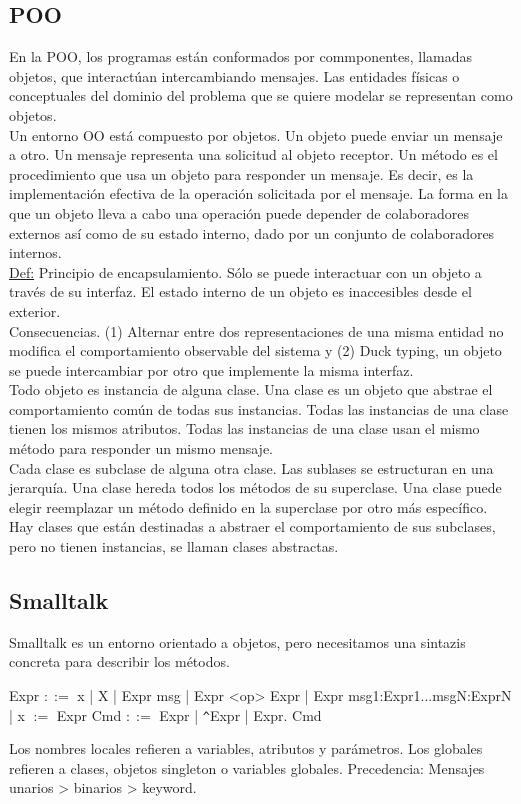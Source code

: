 \documentclass[12pt]{extarticle}
\def\definicion{\newline\underline{Def:} }
\begin{document}
\subsection{POO}
En la POO, los programas están conformados por commponentes, llamadas objetos, que interactúan intercambiando mensajes. Las entidades físicas o conceptuales del dominio del problema que se quiere modelar se representan como objetos. \\
Un entorno OO está compuesto por objetos. Un objeto puede enviar un mensaje a otro. Un mensaje representa una solicitud al objeto receptor. Un método es el procedimiento que usa un objeto para responder un mensaje. Es decir, es la implementación efectiva de la operación solicitada por el mensaje. La forma en la que un objeto lleva a cabo una operación puede depender de colaboradores externos así como de su estado interno, dado por un conjunto de colaboradores internos. \\
\definicion Principio de encapsulamiento. Sólo se puede interactuar con un objeto a través de su interfaz. El estado interno de un objeto es inaccesibles desde el exterior. \\
Consecuencias. (1) Alternar entre dos representaciones de una misma entidad no modifica el comportamiento observable del sistema y (2) Duck typing, un objeto se puede intercambiar por otro que implemente la misma interfaz. \\
Todo objeto es instancia de alguna clase. Una clase es un objeto que abstrae el comportamiento común de todas sus instancias. Todas las instancias de una clase tienen los mismos atributos. Todas las instancias de una clase usan el mismo método para responder un mismo mensaje. \\
Cada clase es subclase de alguna otra clase. Las sublases se estructuran en una jerarquía. Una clase hereda todos los métodos de su superclase. Una clase puede elegir reemplazar un método definido en la superclase por otro más específico. Hay clases que están destinadas a abstraer el comportamiento de sus subclases, pero no tienen instancias, se llaman clases abstractas. \\

\subsection{Smalltalk}
Smalltalk es un entorno orientado a objetos, pero necesitamos una sintazis concreta para describir los métodos.
\begin{center}
Expr $::=$ x | X | Expr msg | Expr <op> Expr | Expr msg1:Expr1...msgN:ExprN | x $:=$ Expr
Cmd $::=$ Expr | \verb|^|Expr | Expr. Cmd
\end{center}
Los nombres locales refieren a variables, atributos y parámetros. Los globales refieren a clases, objetos singleton o variables globales. Precedencia: Mensajes unarios > binarios > keyword.
\end{document}
